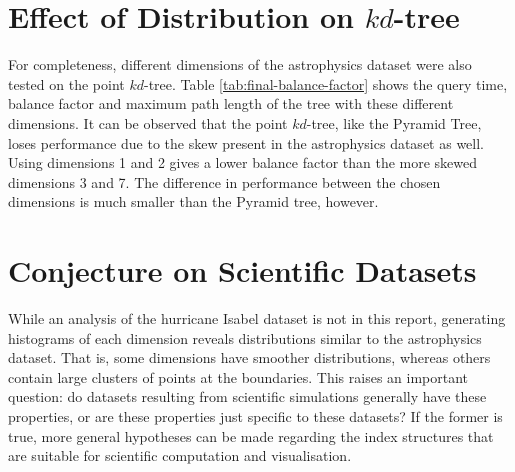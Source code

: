 \section{Effect of Distribution on $kd$-tree}

For completeness, different dimensions of the astrophysics dataset were also tested on the point $kd$-tree. Table \ref{tab:final-balance-factor} shows the query time, balance factor and maximum path length of the tree with these different dimensions. It can be observed that the point $kd$-tree, like the Pyramid Tree, loses performance due to the skew present in the astrophysics dataset as well. Using dimensions 1 and 2 gives a lower balance factor than the more skewed dimensions 3 and 7. The difference in performance between the chosen dimensions is much smaller than the Pyramid tree, however.

\begin{table}
	\centering
	\caption{Point $kd$-tree Statistics with Different Dimensions of Astrophysics Dataset}
	\label{tab:final-balance-factor}
\end{table}

\section{Conjecture on Scientific Datasets}

While an analysis of the hurricane Isabel dataset is not in this report, generating histograms of each dimension reveals distributions similar to the astrophysics dataset. That is, some dimensions have smoother distributions, whereas others contain large clusters of points at the boundaries. This raises an important question: do datasets resulting from scientific simulations generally have these properties, or are these properties just specific to these datasets? If the former is true, more general hypotheses can be made regarding the index structures that are suitable for scientific computation and visualisation.

